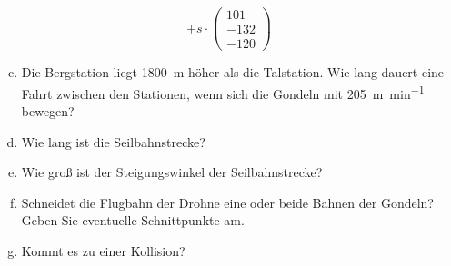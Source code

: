 \begin{exercise}
\begin{equation*}
      +s\cdot
      \begin{pmatrix}\num{101}\\\num{-132}\\\num{-120}\end{pmatrix}
    \end{equation*}
    \begin{enumerate}[a)]
      \setcounter{enumi}{2}%
      \item Die Bergstation liegt \SI{1800}{\metre}
            höher als die Talstation. Wie lang dauert
            eine Fahrt zwischen den Stationen, wenn
            sich die Gondeln mit \SI{205}{\metre\per\minute}
            bewegen?
      \item Wie lang ist die Seilbahnstrecke?
      \item Wie groß ist der Steigungswinkel der
            Seilbahnstrecke?
      \item Schneidet die Flugbahn der Drohne eine oder
            beide Bahnen der Gondeln? Geben Sie
            eventuelle Schnittpunkte am.
      \item Kommt es zu einer Kollision?
    \end{enumerate}
  \fi
\end{exercise}
